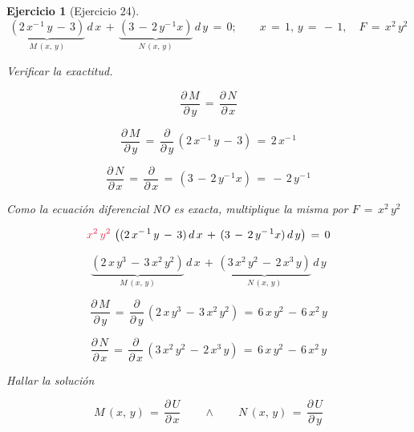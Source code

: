 \documentclass[a4paper,11pt]{book}
\newtheorem{ejer}{Ejercicio}[section]
\begin{document}
\begin{ejer}[Ejercicio 24] 

  $$\underbrace{(2\,x^{-\,1}\,y\,-\,3)}_{M\,(x,\,y)}\,d\,x\,+\,\underbrace{(3\,-\,2\,y^{-\,1}x)}_{N\,(x,\,y)}\,d\,y\,=\,0; \qquad x\,=\,1, \, y\,=\,-\,1, \quad F\,=\,x^{2}\,y^{2}$$ 

  

 

  

 Verificar la exactitud. 

  

$$\dfrac{\partial\,M}{\partial\,y}\,=\,\dfrac{\partial\,N}{\partial\,x}$$ 

  

$$\dfrac{\partial\,M}{\partial\,y}\,=\,\dfrac{\partial}{\partial\,y}\,(2\,x^{-\,1}\,y\,-\,3)\,=\,2\,x^{-\,1}$$ 

  

$$\dfrac{\partial\,N}{\partial\,x}\,=\,\dfrac{\partial}{\partial\,x}\,=\,(3\,-\,2\,y^{-\,1}x)\,=\,-\,2\,y^{-\,1}$$ 

  

 Como la ecuación diferencial NO es exacta, multiplique la misma por $F\,=\,x^{2}\,y^{2}$ 

  


  

$$\textcolor{amaranth}{x^{2}\,y^{2}}\,\left( (2\,x^{-\,1}\,y\,-\,3)\,d\,x\,+\,(3\,-\,2\,y^{-\,1}x)\,d\,y \right) \,=\,0$$ 

  

$$\underbrace{(2\,x\,y^{3}\,-\,3\,x^{2}\,y^{2})}_{M\,(x,\,y)}\,d\,x\,+\,\underbrace{(3\,x^{2}\,y^{2}\,-\,2\,x^{3}\,y)}_{N\,(x,\,y)}\,d\,y$$ 

  

$$\dfrac{\partial\,M}{\partial\,y}\,=\,\dfrac{\partial}{\partial\,y}\,(2\,x\,y^{3}\,-\,3\,x^{2}\,y^{2})\,=\,\boxed{6\,x\,y^{2}\,-\,6\,x^{2}\,y}$$ 

  

$$\dfrac{\partial\,N}{\partial\,x}\,=\,\dfrac{\partial}{\partial\,x}\,(3\,x^{2}\,y^{2}\,-\,2\,x^{3}\,y)\,=\,\boxed{6\,x\,y^{2}\,-\,6\,x^{2}\,y}$$ 

  

 Hallar la solución 

  

$$\boxed{M\,(x,\,y)\,=\,\dfrac{\partial\,U}{\partial\,x}} \qquad \wedge \qquad \boxed{N\,(x,\,y)\,=\,\dfrac{\partial\,U}{\partial\,y}}$$ 


\end{ejer}
\end{document}
